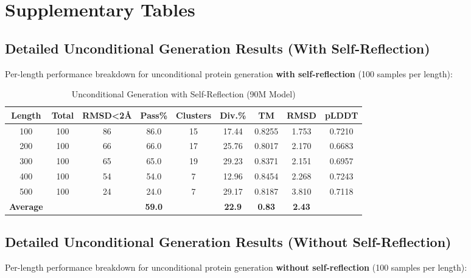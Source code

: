 \documentclass[11pt,a4paper]{article}
\begin{document}
\newpage
\appendix

\section{Supplementary Tables}

\subsection{Detailed Unconditional Generation Results (With Self-Reflection)}

Per-length performance breakdown for unconditional protein generation \textbf{with self-reflection} (100 samples per length):

\begin{table}[h]
\centering
\caption{Unconditional Generation with Self-Reflection (90M Model)}
\begin{tabular}{@{}ccccccccc@{}}
\toprule
\textbf{Length} & \textbf{Total} & \textbf{RMSD<2Å} & \textbf{Pass\%} & \textbf{Clusters} & \textbf{Div.\%} & \textbf{TM} & \textbf{RMSD} & \textbf{pLDDT} \\
\midrule
100 & 100 & 86 & 86.0 & 15 & 17.44 & 0.8255 & 1.753 & 0.7210 \\
200 & 100 & 66 & 66.0 & 17 & 25.76 & 0.8017 & 2.170 & 0.6683 \\
300 & 100 & 65 & 65.0 & 19 & 29.23 & 0.8371 & 2.151 & 0.6957 \\
400 & 100 & 54 & 54.0 & 7 & 12.96 & 0.8454 & 2.268 & 0.7243 \\
500 & 100 & 24 & 24.0 & 7 & 29.17 & 0.8187 & 3.810 & 0.7118 \\
\midrule
\textbf{Average} & & & \textbf{59.0} & & \textbf{22.9} & \textbf{0.83} & \textbf{2.43} & \\
\bottomrule
\end{tabular}
\label{tab:uncond_with_reflection}
\end{table}

\subsection{Detailed Unconditional Generation Results (Without Self-Reflection)}

Per-length performance breakdown for unconditional protein generation \textbf{without self-reflection} (100 samples per length):
\end{document}
